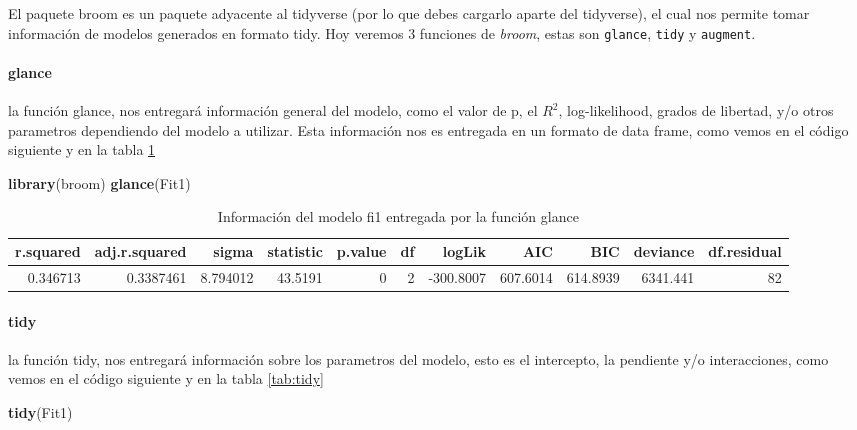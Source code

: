 \documentclass[]{book}
\newenvironment{Shaded}{\begin{snugshade}}{\end{snugshade}}
\newcommand{\KeywordTok}[1]{\textcolor[rgb]{0.13,0.29,0.53}{\textbf{#1}}}
\newcommand{\NormalTok}[1]{#1}
\let\oldparagraph\paragraph
\renewcommand{\paragraph}[1]{\oldparagraph{#1}\mbox{}}
\begin{document}
El paquete broom \citep{Robinson2018} es un paquete adyacente al
tidyverse (por lo que debes cargarlo aparte del tidyverse), el cual nos
permite tomar información de modelos generados en formato tidy. Hoy
veremos 3 funciones de \emph{broom}, estas son \texttt{glance},
\texttt{tidy} y \texttt{augment}.

\hypertarget{glance}{%
\paragraph{glance}\label{glance}}

la función glance, nos entregará información general del modelo, como el
valor de p, el \(R^2\), log-likelihood, grados de libertad, y/o otros
parametros dependiendo del modelo a utilizar. Esta información nos es
entregada en un formato de data frame, como vemos en el código siguiente
y en la tabla \ref{tab:glance}

\begin{Shaded}
\begin{Highlighting}[]
\KeywordTok{library}\NormalTok{(broom)}
\KeywordTok{glance}\NormalTok{(Fit1)}
\end{Highlighting}
\end{Shaded}

\begin{table}

\caption{\label{tab:glance}Información del modelo fi1 entregada por la función glance}
\centering
\begin{tabular}[t]{rrrrrrrrrrr}
\toprule
r.squared & adj.r.squared & sigma & statistic & p.value & df & logLik & AIC & BIC & deviance & df.residual\\
\midrule
0.346713 & 0.3387461 & 8.794012 & 43.5191 & 0 & 2 & -300.8007 & 607.6014 & 614.8939 & 6341.441 & 82\\
\bottomrule
\end{tabular}
\end{table}

\hypertarget{tidy}{%
\paragraph{tidy}\label{tidy}}

la función tidy, nos entregará información sobre los parametros del
modelo, esto es el intercepto, la pendiente y/o interacciones, como
vemos en el código siguiente y en la tabla \ref{tab:tidy}

\begin{Shaded}
\begin{Highlighting}[]
\KeywordTok{tidy}\NormalTok{(Fit1)}
\end{Highlighting}
\end{Shaded}
\end{document}

